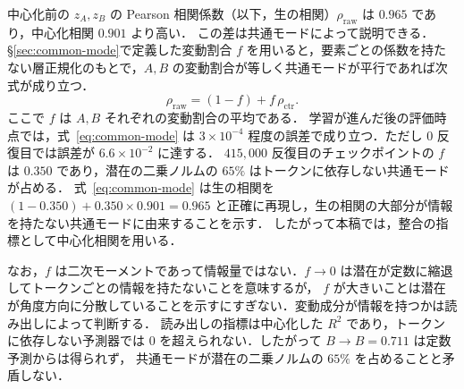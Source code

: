 \documentclass[techrep,noauthor]{ipsj}
\newcommand{\Rsq}{R^2}
\begin{document}
中心化前の $z_A,z_B$ の Pearson 相関係数（以下，生の相関）$\rho_{\mathrm{raw}}$ は $0.965$ であり，中心化相関 $0.901$ より高い．
この差は共通モードによって説明できる．\S\ref{sec:common-mode}で定義した変動割合 $f$ を用いると，要素ごとの係数を持たない層正規化のもとで，$A,B$ の変動割合が等しく共通モードが平行であれば次式が成り立つ．
\begin{equation}\label{eq:common-mode}
\rho_{\mathrm{raw}} = (1-f)+f\,\rho_{\mathrm{ctr}}.
\end{equation}
ここで $f$ は $A,B$ それぞれの変動割合の平均である．
学習が進んだ後の評価時点では，式~\eqref{eq:common-mode} は $3\!\times\!10^{-4}$ 程度の誤差で成り立つ．ただし $0$ 反復目では誤差が $6.6\!\times\!10^{-2}$ に達する．
$415{,}000$ 反復目のチェックポイントの $f$ は $0.350$ であり，潜在の二乗ノルムの $65\%$ はトークンに依存しない共通モードが占める．
式~\eqref{eq:common-mode} は生の相関を $(1{-}0.350)+0.350\times0.901=0.965$ と正確に再現し，生の相関の大部分が情報を持たない共通モードに由来することを示す．
したがって本稿では，整合の指標として中心化相関を用いる．

なお，$f$ は二次モーメントであって情報量ではない．$f\!\to\!0$ は潜在が定数に縮退してトークンごとの情報を持たないことを意味するが，
$f$ が大きいことは潜在が角度方向に分散していることを示すにすぎない．変動成分が情報を持つかは読み出しによって判断する．
読み出しの指標は中心化した $\Rsq$ であり，トークンに依存しない予測器では $0$ を超えられない．したがって $B\!\to\!B=0.711$ は定数予測からは得られず，
共通モードが潜在の二乗ノルムの $65\%$ を占めることと矛盾しない．
\end{document}
